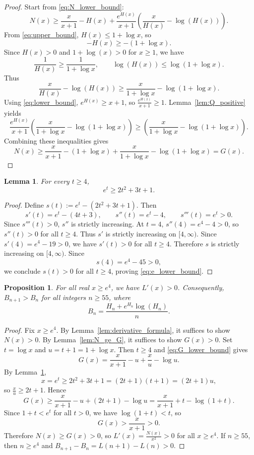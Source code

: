 \documentclass{article}
\newtheorem{lemma}{Lemma}[section]
\newtheorem{proposition}{Proposition}[section]
\begin{document}
\begin{proof}
Start from \eqref{eq:N_lower_bound}:
\[
N(x)\ge \frac{x}{x+1}-H(x)+\frac{e^{H(x)}}{x+1}\left(\frac{x}{H(x)}-\log(H(x))\right).
\]
From \eqref{eq:upper_bound}, $H(x)\le 1+\log x$, so
\[
-H(x)\ge -(1+\log x).
\]
Since $H(x) > 0$ and $1 + \log(x) > 0$ for $x \geq 1$, we have
\[
\frac{1}{H(x)}\ge \frac{1}{1+\log x},
\qquad
\log(H(x))\le \log(1+\log x).
\]
Thus
\[
\frac{x}{H(x)}-\log(H(x))\ge \frac{x}{1+\log x}-\log(1+\log x).
\]
Using \eqref{eq:lower_bound}, $e^{H(x)}\ge x+1$, so $\frac{e^{H(x)}}{x+1}\ge 1$.
Lemma~\ref{lem:Q_positive} yields
\[
\frac{e^{H(x)}}{x+1}\left(\frac{x}{1+\log x}-\log(1+\log x)\right)
\ge
\left(\frac{x}{1+\log x}-\log(1+\log x)\right).
\]
Combining these inequalities gives
\[
N(x)\ge \frac{x}{x+1}-(1+\log x)+\frac{x}{1+\log x}-\log(1+\log x)=G(x).
\]
\end{proof}

\begin{lemma}\label{lem:exp_poly}
For every $t\ge 4$,
\begin{equation}\label{eq:e_lower_bound}
e^t\ge 2t^2+3t+1.
\end{equation}
\end{lemma}

\begin{proof}
Define $s(t):=e^t-(2t^2+3t+1)$. Then
\[
s'(t)=e^t-(4t+3),\qquad s''(t)=e^t-4,\qquad s'''(t)=e^t>0.
\]
Since $s'''(t)>0$, $s''$ is strictly increasing. At $t=4$, $s''(4)=e^4-4>0$, so $s''(t)>0$ for all $t\ge 4$.
Thus $s'$ is strictly increasing on $[4,\infty)$. Since $s'(4)=e^4-19>0$, we have $s'(t)>0$ for all $t\ge 4$.
Therefore $s$ is strictly increasing on $[4,\infty)$. Since
\[
s(4)=e^4-45>0,
\]
we conclude $s(t)>0$ for all $t\ge 4$, proving \eqref{eq:e_lower_bound}.
\end{proof}

\begin{proposition}\label{prop:L_increasing}
For all real $x\ge e^4$, we have $L'(x)>0$. Consequently, $B_{n+1}>B_n$ for all integers $n\ge 55$, where
\[
B_n=\frac{H_n+e^{H_n}\log(H_n)}{n}.
\]
\end{proposition}

\begin{proof}
Fix $x\ge e^4$. By Lemma~\ref{lem:derivative_formula}, it suffices to show $N(x)>0$.
By Lemma~\ref{lem:N_ge_G}, it suffices to show $G(x)>0$.
Set $t=\log x$ and $u=t+1=1+\log x$. Then $t\ge 4$ and \eqref{eq:G_lower_bound} gives
\[
G(x)=\frac{x}{x+1}-u+\frac{x}{u}-\log u.
\]
By Lemma~\ref{lem:exp_poly},
\[
x=e^t\ge 2t^2+3t+1=(2t+1)(t+1)=(2t+1)u,
\]
so $\frac{x}{u}\ge 2t+1$. Hence
\[
G(x)\ge \frac{x}{x+1}-u+(2t+1)-\log u
=\frac{x}{x+1}+t-\log(1+t).
\]
Since $1+t<e^t$ for all $t>0$, we have $\log(1+t)<t$, so
\[
G(x)>\frac{x}{x+1}>0.
\]
Therefore $N(x)\ge G(x)>0$, so $L'(x)=\frac{N(x)}{x^2}>0$ for all $x\ge e^4$.
If $n\ge 55$, then $n\ge e^4$ and $B_{n+1}-B_n=L(n+1)-L(n)>0$.
\end{proof}
\end{document}
